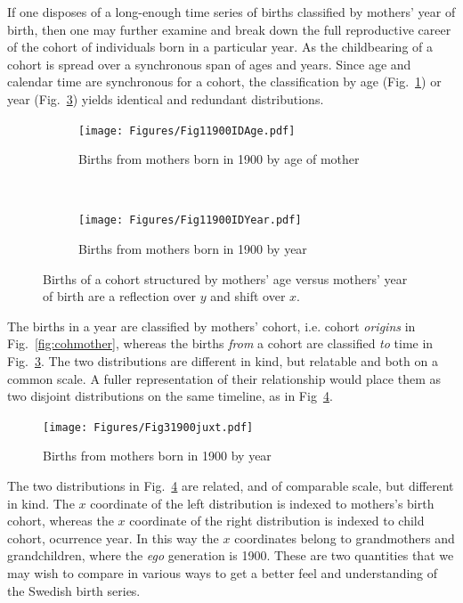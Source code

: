 \documentclass{article}
\begin{document}
If one disposes of a long-enough time series of births classified by mothers' year of birth, then one may further examine and break down the full reproductive career of the cohort of individuals born in a particular year. As the childbearing of a cohort is spread over a synchronous span of ages and years. Since age and calendar time are synchronous for a cohort, the classification by age (Fig.~\ref{fig:age1900mother}) or year (Fig.~\ref{fig:year1900}) yields identical and redundant distributions.

\begin{figure}[ht!]
\begin{subfigure}[t]{0.5\textwidth}
        \centering
        \texttt{[image: Figures/Fig11900IDAge.pdf]}
        \caption{Births from mothers born in 1900 by age of mother}
        \label{fig:age1900mother}
\end{subfigure}
~
\begin{subfigure}[t]{0.5\textwidth}
        \centering
        \texttt{[image: Figures/Fig11900IDYear.pdf]}
        \caption{Births from mothers born in 1900 by year}
          \label{fig:year1900}
\end{subfigure}
\caption{Births of a cohort structured by mothers' age versus mothers' year of birth are a
reflection over $y$ and shift over $x$.}
\end{figure}

The births in a year are classified by mothers' cohort, i.e. cohort \emph{origins} in Fig.~\ref{fig:cohmother}, whereas the births \emph{from} a cohort are classified \emph{to} time in Fig.~\ref{fig:year1900}. The two distributions are different in kind, but relatable and both on a common scale. A fuller representation of their relationship would place them as two disjoint distributions on the same timeline, as in Fig~\ref{fig:juxt}.

\begin{figure}[ht!]
 \centering
        \texttt{[image: Figures/Fig31900juxt.pdf]}
        \caption{Births from mothers born in 1900 by year}
          \label{fig:juxt}
\end{figure}

The two distributions in Fig.~\ref{fig:juxt} are related, and of comparable scale, but different in kind. The $x$ coordinate of the left distribution is indexed to mothers's birth cohort, whereas the $x$ coordinate of the right distribution is indexed to child cohort, ocurrence year. In this way the $x$ coordinates belong to grandmothers and grandchildren, where the \emph{ego} generation is 1900. These are two quantities that we may wish to compare in various ways to get a better feel and understanding of the Swedish birth series. 
\end{document}
